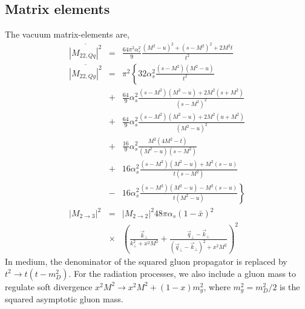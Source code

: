 \documentclass[aps, prc, reprint, amsmath, groupedaddress, nofootinbib]{revtex4-1}
\begin{document}
\begin{appendices}
\section{Matrix elements}
\label{appendix:matrix-element}
The vacuum matrix-elements are,
\begin{eqnarray}
\overline{|M_{22,Qq}|^2} &=& \frac{64\pi^2\alpha_s^2}{9} \frac{(M^2-u)^2 + (s-M^2)^2 + 2 M^2 t}{t^2}
\nonumber
\\
\overline{|M_{22,Qg}|^2} &=& \pi^2 \left\{
32\alpha_s^2 \frac{(s-M^2)(M^2-u)}{t^2} \right.
\nonumber
\\
&+&\frac{64}{9}\alpha_s^2 \frac{(s-M^2)(M^2-u)+2M^2(s+M^2)}{(s-M^2)^2} \nonumber
\\
&+&\frac{64}{9}\alpha_s^2 \frac{(s-M^2)(M^2-u)+2M^2(u+M^2)}{(M^2-u)^2} \nonumber
\\
&+& \frac{16}{9}\alpha_s^2 \frac{M^2(4M^2 - t)}{(M^2-u)(s-M^2)} 
\nonumber
\\
&+& 16 \alpha_s^2 \frac{(s-M^2)(M^2-u)+M^2(s-u)}{t(s-M^2)}
\nonumber
\\
&-& \left. 16 \alpha_s^2 \frac{(s-M^2)(M^2-u)-M^2(s-u)}{t(M^2-u)}\right\}
\nonumber
\\
|M_{2\rightarrow 3}|^2 &=& |M_{2\rightarrow 2}|^2 48 \pi \alpha_s (1-\bar{x})^2
\nonumber
\\
&\times&\left(\frac{\vec{k}_\perp}{k_\perp^2 + x^2 M^2} + \frac{\vec{q}_\perp - \vec{k}_\perp}{(\vec{q}_\perp-\vec{k}_\perp)^2 + x^2 M^2}
\right)^2 
\end{eqnarray}
In medium, the denominator of the squared gluon propagator is replaced by $t^2 \rightarrow t(t-m_D^2)$. 
For the radiation processes, we also include a gluon mass to regulate soft divergence $x^2M^2 \rightarrow x^2M^2 + (1-x)m_g^2$, where $m_g^2 = m_D^2/2$ is the squared asymptotic gluon mass. 


\end{appendices}
\end{document}
